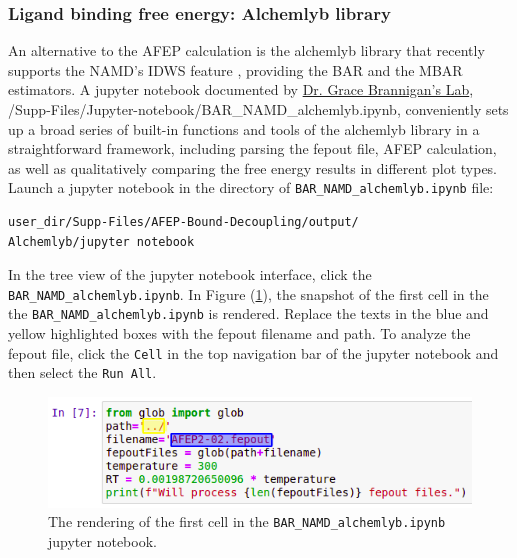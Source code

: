\documentclass[9pt,tutorial]{livecoms}
\begin{document}
\subsubsection{Ligand binding free energy: Alchemlyb library}
An alternative to the AFEP calculation is the alchemlyb library that recently supports the NAMD's IDWS feature \cite{chodera2016simple, shirts2008statistically}, providing the BAR and the MBAR estimators. A jupyter notebook documented by \href{https://github.com/BranniganLab/safep}{Dr. Grace Brannigan's Lab}, /Supp-Files/Jupyter-notebook/BAR\_NAMD\_alchemlyb.ipynb, conveniently sets up a broad series of built-in functions and tools of the alchemlyb library in a straightforward framework, including parsing the fepout file, AFEP calculation, as well as qualitatively comparing the free energy results in different plot types. Launch a jupyter notebook in the directory of \texttt{BAR\_NAMD\_alchemlyb.ipynb} file:
\begin{verbatim}
user_dir/Supp-Files/AFEP-Bound-Decoupling/output/
Alchemlyb/jupyter notebook
\end{verbatim}
In the tree view of the jupyter notebook interface, click the \texttt{BAR\_NAMD\_alchemlyb.ipynb}. In Figure (\ref{fig:BAR_NAMD_alchemlyb}), the snapshot of the first cell in the the \texttt{BAR\_NAMD\_alchemlyb.ipynb} is rendered. Replace the texts in the blue and yellow highlighted boxes with the fepout filename and path. To analyze the fepout file, click the \texttt{Cell} in the top navigation bar of the jupyter notebook and then select the \texttt{Run All}. 
\begin{figure}[h!]
\centering
\includegraphics[width=\linewidth]{ipynb.png}
\caption{The rendering of the first cell in the \texttt{BAR\_NAMD\_alchemlyb.ipynb} jupyter notebook.}\label{fig:BAR_NAMD_alchemlyb}
\end{figure}
\end{document}
